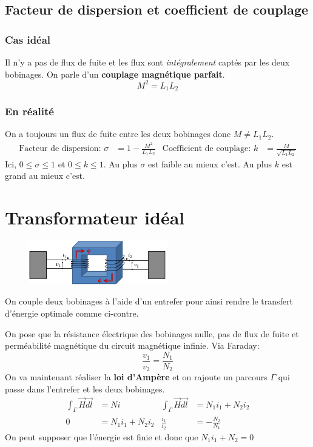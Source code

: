 \documentclass{report}
\begin{document}
\subsection{Facteur de dispersion et coefficient de couplage}
\subsubsection{Cas idéal}
Il n'y a pas de flux de fuite et les flux sont \textit{intégralement} captés par les deux bobinages. On parle d'un \textbf{couplage magnétique parfait}.
\begin{equation}
M^2 = L_1 L_2
\end{equation}

\subsubsection{En réalité}
On a toujours un flux de fuite entre les deux bobinages donc $M \neq L_1 L_2$.
\begin{align*}
\text{Facteur de dispersion: } \sigma &= 1 - \frac{M^2}{L_1 L_2} & \text{Coefficient de couplage: } k &= \frac{M}{\sqrt{L_1 L_2}}
\end{align*}
Ici, $0 \leqslant \sigma \leqslant 1$ et $0 \leqslant k \leqslant 1$. Au plus $\sigma$ est faible au mieux c'est. Au plus $k$ est grand au mieux c'est.

\section{Transformateur idéal}
\begin{figure}
\centering
\includegraphics[width=6cm]{img/transfoBobinages.png}
\end{figure}
On couple deux bobinages à l'aide d'un entrefer pour ainsi rendre le transfert d'énergie optimale comme ci-contre.\par
On pose que la résistance électrique des bobinages nulle, pas de flux de fuite et perméabilité magnétique du circuit magnétique infinie. Via Faraday:
\begin{equation}
\frac{v_1}{v_2} = \frac{N_1}{N_2}
\end{equation}
On va maintenant réaliser la \textbf{loi d'Ampère} et on rajoute un parcours $\Gamma$ qui passe dans l'entrefer et les deux bobinages.
\begin{align*}
\int_{\Gamma} \overrightarrow{H} \overrightarrow{dl} &= N i & \int_{\Gamma} \overrightarrow{H} \overrightarrow{dl} &= N_1 i_1 + N_2 i_2\\
0 &= N_1 i_1 + N_2 i_2 & \frac{i_1}{i_2} &= - \frac{N_2}{N_1}
\end{align*}
On peut supposer que l'énergie est finie et donc que $N_1 i_1 + N_2 = 0$
\end{document}
